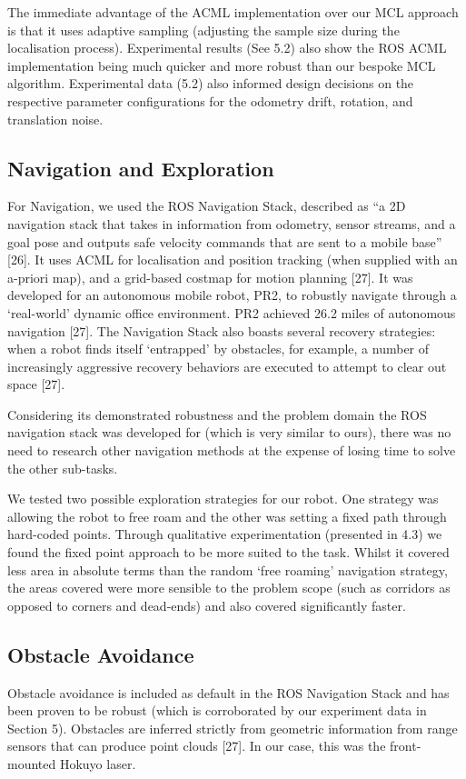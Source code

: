 \documentclass{article}
\begin{document}
The immediate advantage of the ACML implementation over our MCL approach is that it uses adaptive sampling (adjusting the sample size during the localisation process). Experimental results (See 5.2) also show the ROS ACML implementation being much quicker and more robust than our bespoke MCL algorithm. Experimental data (5.2) also informed design decisions on the respective parameter configurations for the odometry drift, rotation, and translation noise.

	\subsection{Navigation and Exploration}
	For Navigation, we used the ROS Navigation Stack,  described as “a 2D navigation stack that takes in information from odometry, sensor streams, and a goal pose and outputs safe velocity commands that are sent to a mobile base” [26].  It uses ACML for localisation and position tracking (when supplied with an a-priori map), and a grid-based costmap for motion planning [27]. It was developed for an autonomous mobile robot, PR2, to robustly navigate through a ‘real-world’ dynamic office environment. PR2 achieved 26.2 miles of autonomous navigation [27].  The Navigation Stack also boasts several recovery strategies: when a robot finds itself ‘entrapped’ by obstacles, for example, a number of increasingly aggressive recovery behaviors are executed to attempt to clear out space [27]. 

Considering its demonstrated robustness and the problem domain the ROS navigation stack was developed for (which is very similar to ours), there was no need to research other navigation methods at the expense of losing time to solve the other sub-tasks.

We tested two possible exploration strategies for our robot. One strategy was allowing the robot to free roam and the other was setting a fixed path through hard-coded points. Through qualitative experimentation (presented in 4.3) we found the fixed point approach to be more suited to the task. Whilst it covered less area in absolute terms than the random ‘free roaming’ navigation strategy, the areas covered were more sensible to the problem scope (such as corridors as opposed to corners and dead-ends) and also covered significantly faster.

	\subsection{Obstacle Avoidance}
	Obstacle avoidance is included as default in the ROS Navigation Stack and has been proven to be robust (which is corroborated by our experiment data in Section 5). Obstacles are inferred strictly from geometric information from range sensors that can produce point clouds [27]. In our case, this was the front-mounted Hokuyo laser. 
\end{document}
